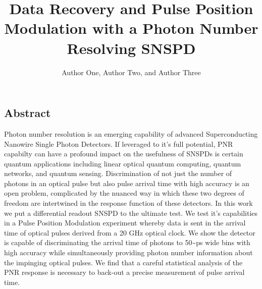 \documentclass{optica-article}
\begin{document}
\title{Data Recovery and Pulse Position Modulation with a Photon Number Resolving SNSPD}

\author{Author One, Author Two, and Author Three}

\address{Peer Review, Publications Department, Optica Publishing Group, 2010 Massachusetts Avenue NW, Washington, DC 20036, USA\\
Publications Department, Optica Publishing Group, 2010 Massachusetts Avenue NW, Washington, DC 20036, USA\\
Currently with the Department of Electronic Journals, Optica Publishing Group, 2010 Massachusetts Avenue NW, Washington, DC 20036, USA}



\begin{abstract*} 

\end{abstract*}

\subsection{Abstract}

Photon number resolution is an emerging capability of advanced Superconducting Nanowire Single Photon Detectors. If leveraged to it's full potential, PNR capabilty can have a profound impact on the usefulness of SNSPDs is certain quantum applications including linear optical quantum computing, quantum networks, and quantum sensing. Discrimination of not just the number of photons in an optical pulse but also pulse arrival time with high accuracy is an open problem, complicated by the nuanced way in which these two degrees of freedom are intertwined in the response function of these detectors. In this work we put a differential readout SNSPD to the ultimate test. We test it's capabilities in a Pulse Position Modulation experiment whereby data is sent in the arrival time of optical pulses derived from a 20 GHz optical clock. We show the detector is capable of discriminating the arrival time of photons to 50\textasciitilde ps wide bins with high accuracy while simultaneously providing photon number information about the impinging optical pulses. We find that a careful statistical analysis of the PNR response is necessary to back-out a precise measurement of pulse arrival time.
\end{document}

